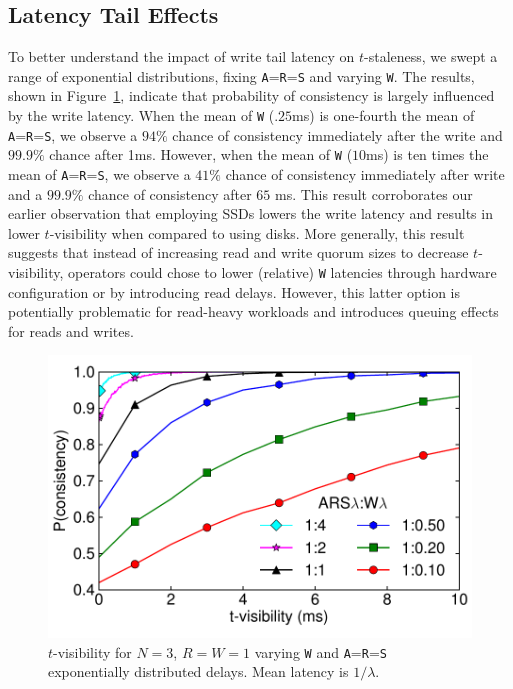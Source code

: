 \documentclass{vldb}
\newcommand{\subsectionskip}{-0em}
\begin{document}
\vspace{\subsectionskip}\subsection{Latency Tail Effects}

To better understand the impact of write tail latency on
$t$-staleness, we swept a range of exponential distributions, fixing
\texttt{A}=\texttt{R}=\texttt{S} and varying \texttt{W}.  The results,
shown in Figure~\ref{fig:varydelay}, indicate that probability of
consistency is largely influenced by the write latency. When the mean
of \texttt{W} ($.25$ms) is one-fourth the mean of
\texttt{A}=\texttt{R}=\texttt{S}, we observe a $94\%$ chance of
consistency immediately after the write and $99.9\%$ chance after 1ms.
However, when the mean of \texttt{W} ($10$ms) is ten times the mean of
\texttt{A}=\texttt{R}=\texttt{S}, we observe a $41\%$ chance of
consistency immediately after write and a $99.9\%$ chance of
consistency after $65$ ms. This result corroborates our earlier
observation that employing SSDs lowers the write latency and results
in lower $t$-visibility when compared to using disks.  More generally,
this result suggests that instead of increasing read and write quorum
sizes to decrease $t$-visibility, operators could chose to lower
(relative) \texttt{W} latencies through hardware configuration or by
introducing read delays.  However, this latter option is potentially
problematic for read-heavy workloads and introduces queuing effects
for reads and writes.

\begin{figure}
\centering
\includegraphics[width=.85\columnwidth]{figs/rwratio.pdf}
\vspace{-8pt}
\caption{$t$-visibility for $N$$=$$3$, $R$$=$$W$$=$$1$ varying \texttt{W} and \texttt{A}=\texttt{R}=\texttt{S} exponentially distributed delays.  Mean latency is $1/\lambda$.}
\vspace{-12pt}
\label{fig:varydelay}
\end{figure}
\end{document}
